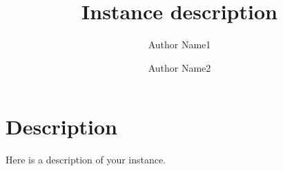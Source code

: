 \documentclass{article}
\title{Instance description}
\author[1]{Author Name1}
\author[1,2]{Author Name2}
\affil[1]{Affiliation1}
\affil[2]{Affiliation2}
\begin{document}
\maketitle

\section{Description}
Here is a description of your instance.
\end{document}
